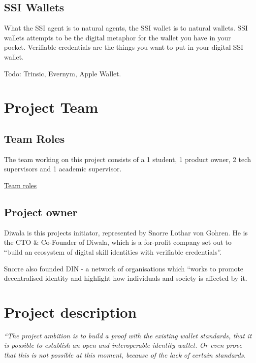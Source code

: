 \hypertarget{ssi-wallets}{%
\subsection{SSI Wallets}\label{ssi-wallets}}

What the SSI agent is to natural agents, the SSI wallet is to natural
wallets. SSI wallets attempts to be the digital metaphor for the wallet
you have in your pocket. Verifiable credentials are the things you want
to put in your digital SSI wallet.

Todo: Trinsic, Evernym, Apple Wallet.

\hypertarget{project-team}{%
\section{Project Team}\label{project-team}}

\hypertarget{team-roles}{%
\subsection{Team Roles}\label{team-roles}}

The team working on this project consists of a 1 student, 1 product
owner, 2 tech supervisors and 1 academic supervisor.

\href{Introduction\%2099c57a51162f4f85bc7ec35261236693/Team\%20roles\%200464c60de630404e9d65e3e9be4e9695.csv}{Team
roles}

\hypertarget{project-owner}{%
\subsection{Project owner}\label{project-owner}}

Diwala is this projects initiator, represented by Snorre Lothar von
Gohren. He is the CTO \& Co-Founder of Diwala, which is a for-profit
company set out to ``build an ecosystem of digital skill identities with
verifiable credentials''.

Snorre also founded DIN - a network of organisations which ``works to
promote decentralised identity and highlight how individuals and society
is affected by it.

\hypertarget{project-description}{%
\section{Project description}\label{project-description}}

\emph{``The project ambition is to build a proof with the existing
wallet standards, that it is possible to establish an open and
interoperable identity wallet. Or even prove that this is not possible
at this moment, because of the lack of certain standards.}

